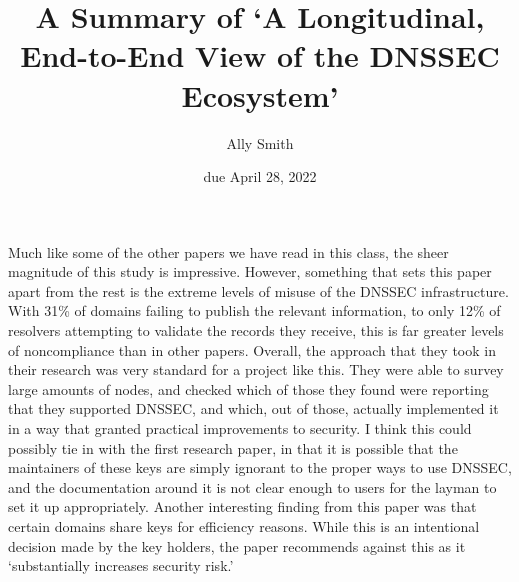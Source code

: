 \documentclass[12pt]{article}
\title{\bf A Summary of `A Longitudinal, End-to-End View of
the DNSSEC Ecosystem'}
\author{Ally Smith}
\date{due April 28, 2022}
\begin{document}
\maketitle{}

Much like some of the other papers we have read in this class, the sheer
magnitude of this study is impressive. However, something that sets this paper
apart from the rest is the extreme levels of misuse of the DNSSEC
infrastructure. With 31\% of domains failing to publish the relevant
information, to only 12\% of resolvers attempting to validate the records they
receive, this is far greater levels of noncompliance than in other papers.
Overall, the approach that they took in their research was very standard for a
project like this. They were able to survey large amounts of nodes, and checked
which of those they found were reporting that they supported DNSSEC, and which,
out of those, actually implemented it in a way that granted practical
improvements to security. I think this could possibly tie in with the first
research paper, in that it is possible that the maintainers of these keys are
simply ignorant to the proper ways to use DNSSEC, and the documentation around
it is not clear enough to users for the layman to set it up appropriately.
Another interesting finding from this paper was that certain domains share keys
for efficiency reasons. While this is an intentional decision made by the key
holders, the paper recommends against this as it `substantially increases
security risk.'
\end{document}
